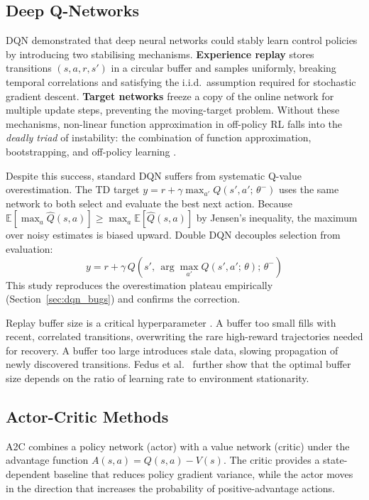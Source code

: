 \documentclass[a4paper,12pt]{article}
\begin{document}
\subsection{Deep Q-Networks}

DQN \cite{mnih2015human} demonstrated that deep neural networks could stably learn control policies by introducing two stabilising mechanisms. \textbf{Experience replay} stores transitions $(s, a, r, s')$ in a circular buffer and samples uniformly, breaking temporal correlations and satisfying the i.i.d.\ assumption required for stochastic gradient descent. \textbf{Target networks} freeze a copy of the online network for multiple update steps, preventing the moving-target problem. Without these mechanisms, non-linear function approximation in off-policy RL falls into the \textit{deadly triad} of instability: the combination of function approximation, bootstrapping, and off-policy learning \cite{sutton2018reinforcement}.

Despite this success, standard DQN suffers from systematic Q-value overestimation. The TD target $y = r + \gamma \max_{a'} Q(s', a';\, \theta^-)$ uses the same network to both select and evaluate the best next action. Because $\mathbb{E}[\max_a \hat{Q}(s,a)] \geq \max_a \mathbb{E}[\hat{Q}(s,a)]$ by Jensen's inequality, the maximum over noisy estimates is biased upward. Double DQN \cite{van2016deep} decouples selection from evaluation:
\begin{equation}
  y = r + \gamma\, Q\!\left(s',\, \arg\max_{a'} Q(s', a';\, \theta);\, \theta^-\right)
\end{equation}
This study reproduces the overestimation plateau empirically (Section~\ref{sec:dqn_bugs}) and confirms the correction.

Replay buffer size is a critical hyperparameter \cite{zhang2019deeper}. A buffer too small fills with recent, correlated transitions, overwriting the rare high-reward trajectories needed for recovery. A buffer too large introduces stale data, slowing propagation of newly discovered transitions. Fedus et al.\ \cite{fedus2020revisiting} further show that the optimal buffer size depends on the ratio of learning rate to environment stationarity.

\subsection{Actor-Critic Methods}

A2C \cite{mnih2016asynchronous} combines a policy network (actor) with a value network (critic) under the advantage function $A(s,a) = Q(s,a) - V(s)$. The critic provides a state-dependent baseline that reduces policy gradient variance, while the actor moves in the direction that increases the probability of positive-advantage actions.
\end{document}

